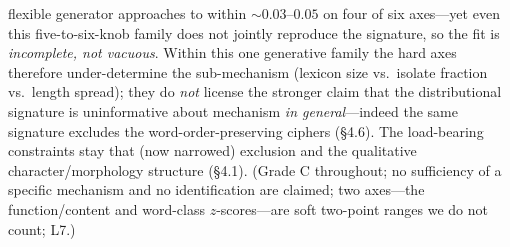 \documentclass[11pt]{article}
\begin{document}
flexible generator approaches to within $\sim\!0.03$--$0.05$ on four of six axes---yet even
this five-to-six-knob family does not jointly reproduce the signature, so the fit is
\emph{incomplete, not vacuous}. Within this one generative family the hard axes therefore
under-determine the sub-mechanism (lexicon size vs.\ isolate fraction vs.\ length spread);
they do \emph{not} license the stronger claim that the distributional signature is
uninformative about mechanism \emph{in general}---indeed the same signature excludes the
word-order-preserving ciphers (\S4.6). The load-bearing constraints stay that (now narrowed) exclusion
and the qualitative character/morphology structure (\S4.1). (Grade C throughout; no
sufficiency of a specific mechanism and no identification are claimed; two axes---the
function/content and word-class $z$-scores---are soft two-point ranges we do not count; L7.)
\end{document}
